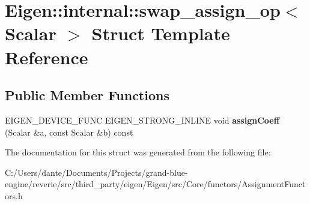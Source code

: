 \hypertarget{struct_eigen_1_1internal_1_1swap__assign__op}{}\section{Eigen\+::internal\+::swap\+\_\+assign\+\_\+op$<$ Scalar $>$ Struct Template Reference}
\label{struct_eigen_1_1internal_1_1swap__assign__op}
\subsection*{Public Member Functions}
\begin{DoxyCompactItemize}
\item 
\mbox{\label{struct_eigen_1_1internal_1_1swap__assign__op_ab1fe79d889055ac656e96f7c7a51b11c}} 
E\+I\+G\+E\+N\+\_\+\+D\+E\+V\+I\+C\+E\+\_\+\+F\+U\+NC E\+I\+G\+E\+N\+\_\+\+S\+T\+R\+O\+N\+G\+\_\+\+I\+N\+L\+I\+NE void {\bfseries assign\+Coeff} (Scalar \&a, const Scalar \&b) const
\end{DoxyCompactItemize}


The documentation for this struct was generated from the following file\+:\begin{DoxyCompactItemize}
\item 
C\+:/\+Users/dante/\+Documents/\+Projects/grand-\/blue-\/engine/reverie/src/third\+\_\+party/eigen/\+Eigen/src/\+Core/functors/Assignment\+Functors.\+h\end{DoxyCompactItemize}
